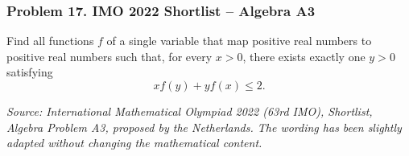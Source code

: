 \subsubsection*{Problem 17. IMO 2022 Shortlist -- Algebra A3}

\begin{exercisebox}[medium]

Find all functions $f$ of a single variable that map
positive real numbers to positive real numbers such
that, for every $x>0$, there exists exactly one
$y>0$ satisfying
\[
xf(y)+yf(x)\leq2.
\]

\medskip
\noindent
\textit{Source: International Mathematical Olympiad
2022 (63rd IMO), Shortlist, Algebra Problem A3,
proposed by the Netherlands. The wording has been
slightly adapted without changing the mathematical
content.}


\end{exercisebox}